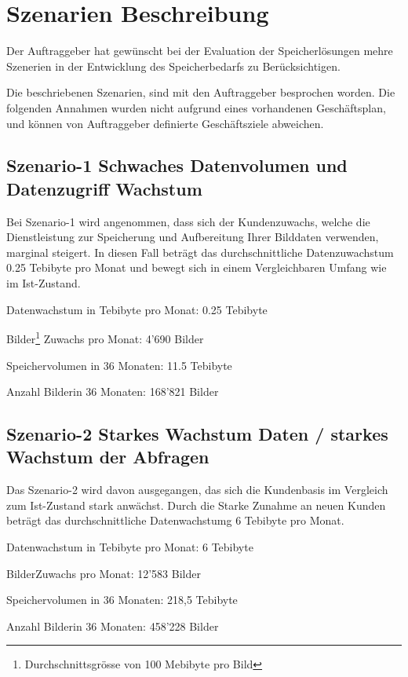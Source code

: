 
\cleardoublepage
\chapter{Szenarien Beschreibung}
Der Auftraggeber hat gewünscht bei der Evaluation der Speicherlösungen mehre Szenerien in der Entwicklung des Speicherbedarfs zu Berücksichtigen. 

Die beschriebenen Szenarien, sind mit den Auftraggeber besprochen worden. Die folgenden Annahmen wurden nicht aufgrund eines vorhandenen Geschäftsplan, und können von Auftraggeber definierte Geschäftsziele abweichen. 


\section{Szenario-1 Schwaches Datenvolumen und Datenzugriff Wachstum}\label{Szenario1}
Bei Szenario-1 wird angenommen, dass sich der Kundenzuwachs, welche die Dienstleistung zur Speicherung und Aufbereitung Ihrer Bilddaten verwenden, marginal steigert. In diesen Fall beträgt das durchschnittliche Datenzuwachstum 0.25 Tebibyte pro Monat und bewegt sich in einem Vergleichbaren Umfang wie im Ist-Zustand.


Datenwachstum in Tebibyte pro Monat: 0.25 Tebibyte

Bilder\footnote{Durchschnittsgrösse von 100 Mebibyte pro Bild} Zuwachs pro Monat: 4'690 Bilder

Speichervolumen in 36 Monaten: 11.5 Tebibyte

Anzahl Bilder\footnotemark[\value{footnote}] in 36 Monaten: 168'821 Bilder

\section{Szenario-2  Starkes Wachstum Daten / starkes Wachstum der Abfragen}
Das Szenario-2 wird davon ausgegangen, das sich die Kundenbasis im Vergleich zum Ist-Zustand stark anwächst. Durch die Starke Zunahme an neuen Kunden 
beträgt das durchschnittliche Datenwachstumg 6 Tebibyte pro Monat.


Datenwachstum in Tebibyte pro Monat: 6 Tebibyte

Bilder\footnotemark[\value{footnote}] Zuwachs pro Monat: 12'583 Bilder

Speichervolumen in 36 Monaten: 218,5 Tebibyte

Anzahl Bilder\footnotemark[\value{footnote}] in 36 Monaten: 458'228 Bilder
 

